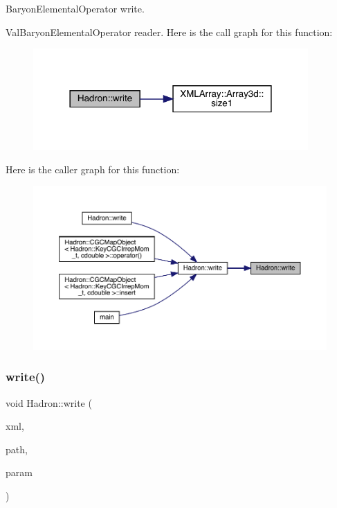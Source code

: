 Baryon\+Elemental\+Operator write. 

Val\+Baryon\+Elemental\+Operator reader. Here is the call graph for this function\+:\nopagebreak
\begin{figure}[H]
\begin{center}
\leavevmode
\includegraphics[width=298pt]{d1/daf/namespaceHadron_a6ba238c6945bb5d95ae189cfee93a690_cgraph}
\end{center}
\end{figure}
Here is the caller graph for this function\+:\nopagebreak
\begin{figure}[H]
\begin{center}
\leavevmode
\includegraphics[width=350pt]{d1/daf/namespaceHadron_a6ba238c6945bb5d95ae189cfee93a690_icgraph}
\end{center}
\end{figure}
\mbox{\label{namespaceHadron_a04a5b512d84ea116e0714765e22cbc30}} 
\subsubsection{\texorpdfstring{write()}{write()}\hspace{0.1cm}{\footnotesize\ttfamily [71/95]}}
{\footnotesize\ttfamily void Hadron\+::write (\begin{DoxyParamCaption}\item[{\mbox{\hyperlink{classADATXML_1_1XMLWriter}{X\+M\+L\+Writer}} \&}]{xml,  }\item[{const std\+::string \&}]{path,  }\item[{const \mbox{\hyperlink{structHadron_1_1KeyHadronSUNNPartIrrepOp__t}{Key\+Hadron\+S\+U\+N\+N\+Part\+Irrep\+Op\+\_\+t}} \&}]{param }\end{DoxyParamCaption})}



